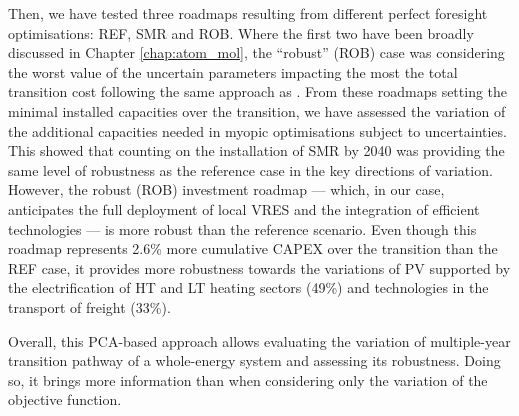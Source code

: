 Then, we have tested three roadmaps resulting from different perfect foresight optimisations: REF, SMR and ROB. Where the first two have been broadly discussed in Chapter \ref{chap:atom_mol}, the ``robust'' (ROB) case was considering the worst value of the uncertain parameters impacting the most the total transition cost following the same approach as \citet{Moret2017PhDThesis}. From these roadmaps setting the minimal installed capacities over the transition, we have assessed the variation of the additional capacities needed in myopic optimisations subject to uncertainties. This showed that counting on the installation of \gls{SMR} by 2040 was providing the same level of robustness as the reference case in the key directions of variation. However, the robust (ROB) investment roadmap --- which, in our case, anticipates the full deployment of local \gls{VRES} and the integration of efficient technologies --- is more robust than the reference scenario. Even though this roadmap represents 2.6\% more cumulative \gls{CAPEX} over the transition than the REF case, it provides more robustness towards the variations of \gls{PV} supported by the electrification of \gls{HT} and \gls{LT} heating sectors (49\%) and technologies in the transport of freight (33\%). 

Overall, this \gls{PCA}-based approach allows evaluating the variation of multiple-year transition pathway of a whole-energy system and assessing its robustness. Doing so, it brings more information than when considering only the variation of the objective function.


